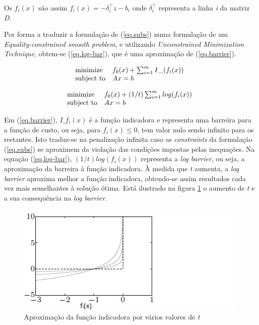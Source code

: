 \documentclass[a4paper]{IEEEtran}
\begin{document}
Os $f_i(x)$ são assim $f_i(x) = -\delta_i^\top z - b_i$ onde $\delta_i^\top$ representa a linha \textit{i} da matriz \textit{D}.

Por forma a traduzir a formulação de (\ref{eq.subs}) numa formulação de um \textit{Equality-constrained smooth problem}, e utilizando \textit{Unconstrained Minimization Technique}, obtem-se (\ref{eq.log-bar}), que é uma aproximação de (\ref{eq.barrier}).

\begin{equation}
\label{eq.barrier}
\begin{array}[t]{ll} \text{minimize} & f_0(x) + \sum_{i=1}^{m} I\_(f_i(x)) \\
\text{subject to} &  Ax=b \end{array}
\end{equation}

\begin{equation}
\label{eq.log-bar}
\begin{array}[t]{ll} \text{minimize} & f_0(x) + (1/t) \sum_{i=1}^{m} log(f_i(x)) \\
\text{subject to} &  Ax=b \end{array}
\end{equation}

Em (\ref{eq.barrier}), $I\_f_i(x)$ é a função indicadora e representa uma barreira para a função de custo, ou seja, para $f_i(x) \leq 0$, tem valor nulo sendo infinito para os restantes. Isto traduz-se na penalização infinita caso as \textit{constraints} da formulação (\ref{eq.subs}) se aproximem da violação das condições impostas pelas inequações. Na equação (\ref{eq.log-bar}), $(1/t) log(f_i(x))$ representa a \textit{log barrier}, ou seja, a aproximação da barreira à função indicadora. À medida que \textit{t} aumenta, a \textit{log barrier} aproxima melhor a função indicadora, obtendo-se assim resultados cada vez mais semelhantes à solução ótima. Está ilustrado na figura \ref{fig:barrier} o aumento de \textit{t} e a sua consequência na \textit{log barrier}.

\begin{figure}[htp]
  \centering
  \captionsetup{font=scriptsize} 
  \includegraphics[width=0.9\columnwidth]{./log-barrier}
  \caption{Aproximação da função indicadora por vários valores de \textit{t}}
  \label{fig:barrier}
\end{figure}
\end{document}
